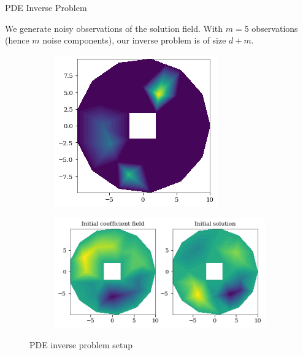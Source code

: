 \documentclass[10pt]{beamer}
\begin{document}
\begin{frame}[fragile]{PDE Inverse Problem}
    
    We generate noisy observations of the solution field. With $m = 5$ observations (hence $m$ noise components), our inverse problem is of size $d + m $.
    
       \begin{figure}
        \begin{subfigure}[b]{0.21\textwidth}
            \includegraphics[width=\textwidth]{pde_obs.png}
        \end{subfigure}%
        \qquad \qquad \qquad
        \begin{subfigure}[b]{0.42\textwidth}
            \includegraphics[width=\textwidth]{pde_initial.png}
        \end{subfigure}
        \caption{PDE inverse problem setup}
    \end{figure}
\end{frame}
\end{document}
